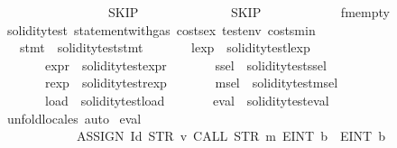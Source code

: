 \begin{isabellebody}
\ \ \ \ \ \ \ \ \ \ \ \ \ \ \ \ {\isacharparenleft}{\kern0pt}{\isacharbrackleft}{\kern0pt}{\isacharbrackright}{\kern0pt}{\isacharcomma}{\kern0pt}\ SKIP{\isacharparenright}{\kern0pt}{\isacharcomma}{\kern0pt}\isanewline
\ \ \ \ \ \ \ \ \ \ \ \ \ \ SKIP{\isacharparenright}{\kern0pt}\isanewline
\ \ \ \ \ \ \ \ \ \ \ \ fmempty{\isachardoublequoteclose}\isanewline
\isanewline
{}\isamarkupfalse%
\ soliditytest{}{\isacharcolon}{\kern0pt}\ statement{\isacharunderscore}{\kern0pt}with{\isacharunderscore}{\kern0pt}gas\ costs{\isacharunderscore}{\kern0pt}ex\ testenv{}\ costs{\isacharunderscore}{\kern0pt}min\isanewline
\ \ \ stmt{}\ {\isacharequal}{\kern0pt}\ {\isachardoublequoteopen}soliditytest{}{\isachardot}{\kern0pt}stmt{\isachardoublequoteclose}\isanewline
\ \ \ \ \ \ \ lexp{}\ {\isacharequal}{\kern0pt}\ soliditytest{}{\isachardot}{\kern0pt}lexp\ \isanewline
\ \ \ \ \ \ \ expr{}\ {\isacharequal}{\kern0pt}\ soliditytest{}{\isachardot}{\kern0pt}expr\isanewline
\ \ \ \ \ \ \ ssel{}\ {\isacharequal}{\kern0pt}\ soliditytest{}{\isachardot}{\kern0pt}ssel\isanewline
\ \ \ \ \ \ \ rexp{}\ {\isacharequal}{\kern0pt}\ soliditytest{}{\isachardot}{\kern0pt}rexp\isanewline
\ \ \ \ \ \ \ msel{}\ {\isacharequal}{\kern0pt}\ soliditytest{}{\isachardot}{\kern0pt}msel\isanewline
\ \ \ \ \ \ \ load{}\ {\isacharequal}{\kern0pt}\ soliditytest{}{\isachardot}{\kern0pt}load\isanewline
\ \ \ \ \ \ \ eval{}\ {\isacharequal}{\kern0pt}\ soliditytest{}{\isachardot}{\kern0pt}eval\isanewline
%
\isadelimproof
\ \ %
\endisadelimproof
%
\isatagproof
{}\isamarkupfalse%
\ unfold{\isacharunderscore}{\kern0pt}locales\ auto%
\endisatagproof
{\isafoldproof}%
%
\isadelimproof
\isanewline
%
\endisadelimproof
\isanewline
{}\isamarkupfalse%
\ {\isachardoublequoteopen}eval{}\ {}{}{}{}\isanewline
\ \ \ \ \ \ \ \ \ \ \ \ {\isacharparenleft}{\kern0pt}ASSIGN\ {\isacharparenleft}{\kern0pt}Id\ {\isacharparenleft}{\kern0pt}STR\ {\isacharprime}{\kern0pt}{\isacharprime}{\kern0pt}v{}{\isacharprime}{\kern0pt}{\isacharprime}{\kern0pt}{\isacharparenright}{\kern0pt}{\isacharparenright}{\kern0pt}\ {\isacharparenleft}{\kern0pt}CALL\ {\isacharparenleft}{\kern0pt}STR\ {\isacharprime}{\kern0pt}{\isacharprime}{\kern0pt}m{}{\isacharprime}{\kern0pt}{\isacharprime}{\kern0pt}{\isacharparenright}{\kern0pt}\ {\isacharbrackleft}{\kern0pt}E{\isachardot}{\kern0pt}INT\ b{}\ {}{\isacharcomma}{\kern0pt}\ E{\isachardot}{\kern0pt}INT\ b{}\ {}{\isacharbrackright}{\kern0pt}{\isacharparenright}{\kern0pt}{\isacharparenright}{\kern0pt}\isanewline

\end{isabellebody}
